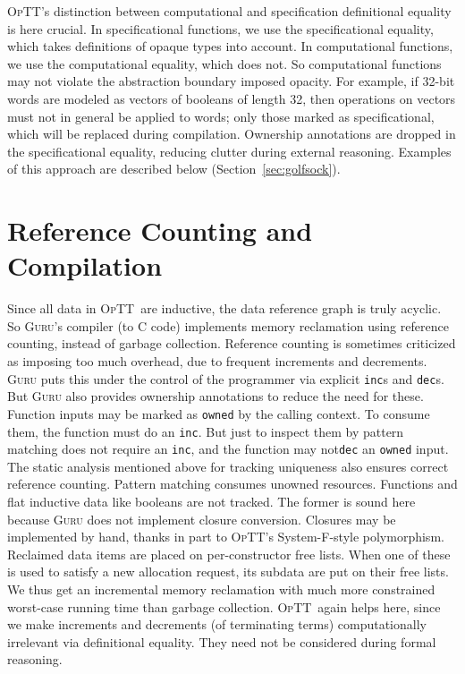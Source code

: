\documentclass[preprint,natbib]{sigplanconf}
\newcommand{\optt}{\textsc{OpTT}}
\begin{document}
\optt's distinction between computational and specification
definitional equality is here crucial.  In specificational functions,
we use the specificational equality, which takes definitions of opaque
types into account.  In computational functions, we use the
computational equality, which does not.  So computational functions
may not violate the abstraction boundary imposed opacity.  For
example, if 32-bit words are modeled as vectors of booleans of length
32, then operations on vectors must not in general be applied to
words; only those marked as specificational, which will be replaced
during compilation.  Ownership annotations are dropped in the
specificational equality, reducing clutter during external reasoning.
Examples of this approach are described below
(Section~\ref{sec:golfsock}).

\section{Reference Counting and Compilation}
\label{sec:compilation}

Since all data in \optt\ are inductive, the data reference graph is
truly acyclic.  So \textsc{Guru}'s compiler (to C code) implements
memory reclamation using reference counting, instead of garbage
collection.  Reference counting is sometimes criticized as imposing
too much overhead, due to frequent increments and decrements.
\textsc{Guru} puts this under the control of the programmer via
explicit \texttt{inc}s and \texttt{dec}s.  But \textsc{Guru} also
provides ownership annotations to reduce the need for these.  Function
inputs may be marked as \texttt{owned} by the calling context.  To
consume them, the function must do an \texttt{inc}.  But just to
inspect them by pattern matching does not require an \texttt{inc}, and
the function may not\texttt{dec} an \texttt{owned} input.  The static
analysis mentioned above for tracking uniqueness also ensures correct
reference counting.  Pattern matching consumes unowned resources.
Functions and flat inductive data like booleans are not tracked.  The
former is sound here because \textsc{Guru} does not implement closure
conversion.  Closures may be implemented by hand, thanks in part to
\optt's System-F-style polymorphism.  Reclaimed data items are placed
on per-constructor free lists.  When one of these is used to satisfy a
new allocation request, its subdata are put on their free lists.  We
thus get an incremental memory reclamation with much more constrained
worst-case running time than garbage collection.  \optt\ again helps
here, since we make increments and decrements (of terminating terms)
computationally irrelevant via definitional equality.  They need not
be considered during formal reasoning.
\end{document}
